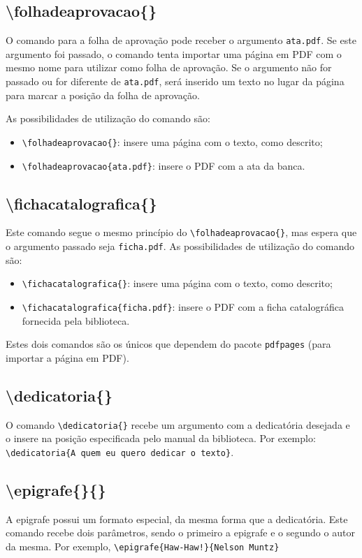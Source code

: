 \documentclass{fei}
\begin{document}
    \subsection{\textbackslash folhadeaprovacao\{\}}
    O comando para a folha de aprovação pode receber o argumento \texttt{ata.pdf}. Se este argumento foi passado, o comando tenta importar uma página em PDF com o mesmo nome para utilizar como folha de aprovação. Se o argumento não for passado ou for diferente de \texttt{ata.pdf}, será inserido um texto no lugar da página para marcar a posição da folha de aprovação.

    As possibilidades de utilização do comando são:
    \begin{itemize}
        \item \verb+\folhadeaprovacao{}+: insere uma página com o texto, como descrito;
        \item \verb+\folhadeaprovacao{ata.pdf}+: insere o PDF com a ata da banca.
    \end{itemize}
    
    
    \subsection{\textbackslash fichacatalografica\{\}}
    Este comando segue o mesmo princípio do \verb+\folhadeaprovacao{}+, mas espera que o argumento passado seja \texttt{ficha.pdf}. As possibilidades de utilização do comando são:
    \begin{itemize}
        \item \verb+\fichacatalografica{}+: insere uma página com o texto, como descrito;
        \item \verb+\fichacatalografica{ficha.pdf}+: insere o PDF com a ficha catalográfica fornecida pela biblioteca.
    \end{itemize}
 
 Estes dois comandos são os únicos que dependem do pacote \texttt{pdfpages} (para importar a página em PDF).

    \subsection{\textbackslash dedicatoria\{\}}
    O comando \verb+\dedicatoria{}+ recebe um argumento com a dedicatória desejada e o insere na posição especificada pelo manual da biblioteca. Por exemplo: \\ \verb+\dedicatoria{A quem eu quero dedicar o texto}+.
    
    \subsection{\textbackslash epigrafe\{\}\{\}}
    A epigrafe possui um formato especial, da mesma forma que a dedicatória. Este comando recebe dois parâmetros, sendo o primeiro a epigrafe e o segundo o autor da mesma. Por exemplo, \verb+\epigrafe{Haw-Haw!}{Nelson Muntz}+
    
\end{document}
